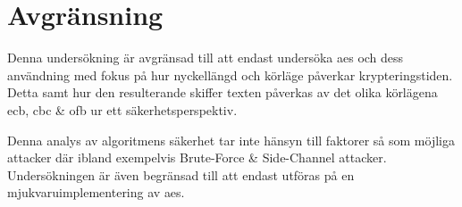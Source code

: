 \section{Avgränsning} %

Denna undersökning är avgränsad till att endast undersöka \acrshort{aes} och dess
användning med fokus på hur nyckellängd och körläge påverkar krypteringstiden. Detta samt hur
den resulterande skiffer texten påverkas av det olika körlägena \acrshort{ecb}, \acrshort{cbc} \& \acrshort{ofb}
ur ett säkerhetsperspektiv.

Denna analys av algoritmens säkerhet tar inte hänsyn till faktorer så som möjliga attacker där
ibland exempelvis Brute-Force
\& Side-Channel attacker. Undersökningen är även
begränsad till att endast utföras på en mjukvaruimplementering av \acrshort{aes}.